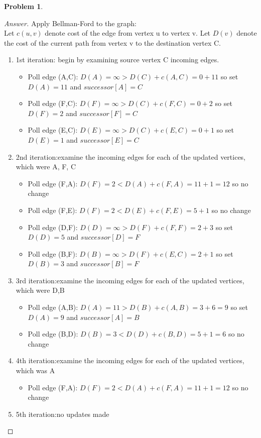\documentclass[11pt]{article}
\theoremstyle{definition}
\theoremstyle{definition}
\newtheorem{required}{Problem}
\theoremstyle{definition}
\begin{document}
\begin{required}
\begin{proof}[Answer]
Apply Bellman-Ford to the graph: \\
Let $c(u,v)$ denote cost of the edge from vertex u to vertex v. Let $D(v)$ denote the cost of the current path from vertex v to the destination vertex C. 
\begin{enumerate}
\item 1st iteration: begin by examining source vertex C incoming edges. 
	\begin{itemize}
	\item Poll edge (A,C): $D(A)=\infty > D(C)+c(A,C)=0+11$ so set $D(A)=11$ and $successor[A]=C$
	\item Poll edge (F,C): $D(F)=\infty > D(C)+c(F,C)=0+2$ so set $D(F)=2$ and $successor[F]=C$
	\item Poll edge (E,C): $D(E)=\infty > D(C)+c(E,C)=0+1$ so set $D(E)=1$ and $successor[E]=C$
	\end{itemize}
\item 2nd iteration:examine the incoming edges for each of the updated vertices, which were A, F, C 
	\begin{itemize}
	\item Poll edge (F,A): $D(F)=2 < D(A)+c(F,A)=11+1=12$ so no change
	\item Poll edge (F,E): $D(F)=2 < D(E)+c(F,E)=5+1$ so no change
	\item Poll edge (D,F): $D(D)=\infty > D(F)+c(F,F)=2+3$ so set $D(D)=5$ and $successor[D]=F$
	\item Poll edge (B,F): $D(B)=\infty > D(F)+c(E,C)=2+1$ so set $D(B)=3$ and $successor[B]=F$
	\end{itemize}
\item 3rd iteration:examine the incoming edges for each of the updated vertices, which were D,B 
	\begin{itemize}
	\item Poll edge (A,B): $D(A)=11> D(B)+c(A,B)=3+6=9$ so set $D(A)=9$ and $successor[A]=B$
	\item Poll edge (B,D): $D(B)=3 < D(D)+c(B,D)=5+1=6$ so no change
	\end{itemize}
\item 4th iteration:examine the incoming edges for each of the updated vertices, which was A
	\begin{itemize}
	\item Poll edge (F,A): $D(F)=2 < D(A)+c(F,A)=11+1=12$ so no change
	\end{itemize}
\item 5th iteration:no updates made
\end{enumerate}

\end{proof}
\end{required}
\end{document}
